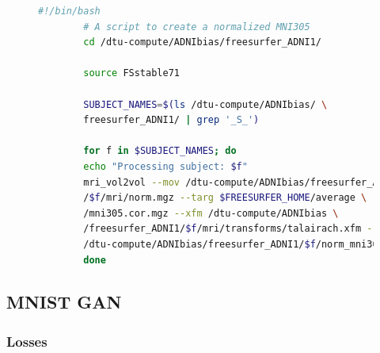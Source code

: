 \documentclass[11pt, fleqn, titlepage]{article}
\newcommand{\1}[1]{\mathds{1}\left[#1\right]}
\begin{document}
 \begin{figure}[H]
 	\scriptsize
 	\begin{lstlisting}[language=bash,caption={FreeSurfer mri\_vol2vol}]
		#!/bin/bash 
		# A script to create a normalized MNI305
		cd /dtu-compute/ADNIbias/freesurfer_ADNI1/
		
		source FSstable71
		
		SUBJECT_NAMES=$(ls /dtu-compute/ADNIbias/ \ 
		freesurfer_ADNI1/ | grep '_S_')
		
		for f in $SUBJECT_NAMES; do 
		echo "Processing subject: $f"
		mri_vol2vol --mov /dtu-compute/ADNIbias/freesurfer_ADNI1 \
		/$f/mri/norm.mgz --targ $FREESURFER_HOME/average \
		/mni305.cor.mgz --xfm /dtu-compute/ADNIbias \ 
		/freesurfer_ADNI1/$f/mri/transforms/talairach.xfm --o \
		/dtu-compute/ADNIbias/freesurfer_ADNI1/$f/norm_mni305.mgz
		done
 	\end{lstlisting}
 	\caption{}
 	\label{script2}
 \end{figure}

\newpage
\subsection{MNIST GAN}\label{MNIST_GAN}

\subsubsection{Losses}
\end{document}
